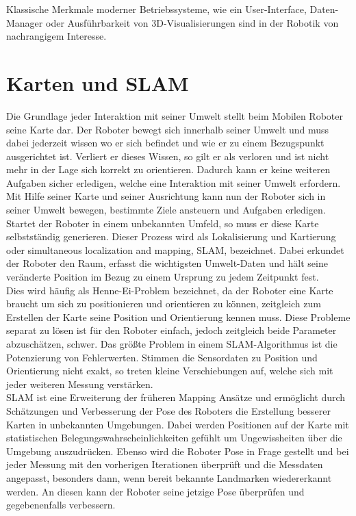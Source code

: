 \documentclass[twoside,11pt, a4paper]{report}
\begin{document}
	Klassische Merkmale moderner Betriebssysteme, wie ein User-Interface, Daten-Manager oder Ausführbarkeit von 3D-Visualisierungen sind in der Robotik von nachrangigem Interesse. 
	
	\section{Karten und SLAM }
	Die Grundlage jeder Interaktion mit seiner Umwelt stellt beim Mobilen Roboter seine Karte dar. Der Roboter bewegt sich innerhalb seiner Umwelt und muss dabei jederzeit wissen wo er sich befindet und wie er zu einem Bezugspunkt ausgerichtet ist. Verliert er dieses Wissen, so gilt er als verloren und ist nicht mehr in der Lage sich korrekt zu orientieren. Dadurch kann er keine weiteren Aufgaben sicher erledigen, welche eine Interaktion mit seiner Umwelt erfordern. \\
	Mit Hilfe seiner Karte und seiner Ausrichtung kann nun der Roboter sich in seiner Umwelt bewegen, bestimmte Ziele ansteuern und Aufgaben erledigen. Startet der Roboter in einem unbekannten Umfeld, so muss er diese Karte selbstständig generieren. Dieser Prozess wird als Lokalisierung und Kartierung oder simultaneous localization and mapping, SLAM, bezeichnet. Dabei erkundet der Roboter den Raum, erfasst die wichtigsten Umwelt-Daten und hält seine veränderte Position im Bezug zu einem Ursprung zu jedem Zeitpunkt fest. \\
	Dies wird häufig als Henne-Ei-Problem bezeichnet, da der Roboter eine Karte braucht um sich zu positionieren und orientieren zu können, zeitgleich zum Erstellen der Karte seine Position und Orientierung kennen muss. Diese Probleme separat zu lösen ist für den Roboter einfach, jedoch zeitgleich beide Parameter abzuschätzen, schwer. Das größte Problem in einem SLAM-Algorithmus ist die Potenzierung von Fehlerwerten. Stimmen die Sensordaten zu Position und Orientierung nicht exakt, so treten kleine Verschiebungen auf, welche sich mit jeder weiteren Messung verstärken. \\
	SLAM ist eine Erweiterung der früheren Mapping Ansätze und ermöglicht durch Schätzungen und Verbesserung der Pose des Roboters die Erstellung besserer Karten in unbekannten Umgebungen. Dabei werden Positionen auf der Karte mit statistischen Belegungswahrscheinlichkeiten gefühlt um Ungewissheiten über die Umgebung auszudrücken. Ebenso wird die Roboter Pose in Frage gestellt und bei jeder Messung mit den vorherigen Iterationen überprüft und die Messdaten angepasst, besonders dann, wenn bereit bekannte Landmarken wiedererkannt werden. An diesen kann der Roboter seine jetzige Pose überprüfen und gegebenenfalls verbessern. \\
\end{document}
